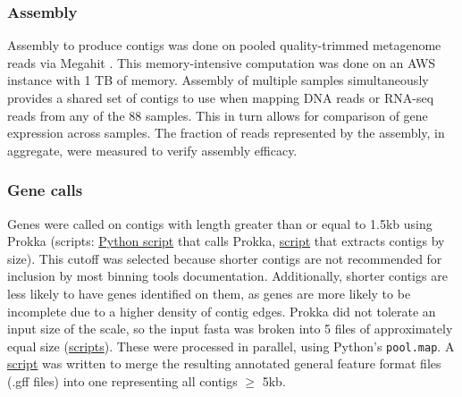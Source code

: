 \subsubsection{Assembly} %
Assembly to produce contigs was done on pooled quality-trimmed metagenome reads via Megahit \cite{li2015}.
This memory-intensive computation was done on an AWS instance with 1 TB of memory.
Assembly of multiple samples simultaneously provides a shared set of contigs to use when mapping DNA reads or RNA-seq reads from any of the 88 samples.
This in turn allows for comparison of gene expression across samples.
The fraction of reads represented by the assembly, in aggregate, were measured to verify assembly efficacy.

\subsubsection{Gene calls}
Genes were called on contigs with length greater than or equal to 1.5kb using Prokka \cite{seemann2014} (scripts: \href{https://github.com/BeckResearchLab/meta4/blob/master/m4b_binning/assembly/prokka/prokka.py}{Python script} that calls Prokka, \href{https://github.com/BeckResearchLab/meta4/blob/master/m4b_binning/assembly/contigs_by_length/select_contigs_by_size.py}{script} that extracts contigs by size).
This cutoff was selected because shorter contigs are not recommended for inclusion by most binning tools documentation.
Additionally, shorter contigs are less likely to have genes identified on them, as genes are more likely to be incomplete due to a higher density of contig edges.
Prokka did not tolerate an input size of the scale, so the input fasta was broken into 5 files of approximately equal size (\href{https://github.com/BeckResearchLab/meta4/tree/master/m4b_binning/assembly/prokka/contigs}{scripts}).
These were processed in parallel, using Python's \texttt{pool.map}.
A \href{https://github.com/BeckResearchLab/meta4/blob/master/m4b_binning/assembly/prokka/contigs/glue_together_gffs.py}{script} was written to merge the resulting annotated general feature format files (.gff files) into one representing all contigs $\geq$ 5kb.

